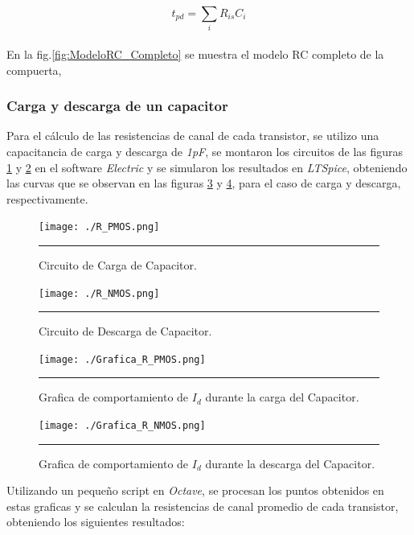 \documentclass[12pt,a4paper]{article} %
\begin{document}
\begin{equation}\label{eqn:Elmore}
t_{pd} = \sum_{i} R_{is}C_{i}
\end{equation}\\


En la fig.\ref{fig:ModeloRC_Completo} se muestra el modelo RC completo de la compuerta,
\subsubsection{Carga y descarga de un capacitor}

Para el cálculo de las resistencias de canal de cada transistor, se utilizo una capacitancia de carga y descarga de \textit{1pF}, se montaron los circuitos de las figuras \ref{fig:R_PMOS} y \ref{fig:R_NMOS} en el software \textit{Electric} y se simularon los resultados en  \textit{LTSpice}, obteniendo las curvas que se observan en las figuras \ref{fig:Grafica_R_PMOS} y \ref{fig:Grafica_R_NMOS}, para el caso de carga y descarga, respectivamente.\\

\begin{figure}[htbp]
  \centering
    \texttt{[image: ./R\_PMOS.png]}
    \rule{35em}{0.3pt}
  \caption[C_Carga]{Circuito de Carga de Capacitor.}
  \label{fig:R_PMOS}
\end{figure}

\begin{figure}[htbp]
  \centering
  	\texttt{[image: ./R\_NMOS.png]}
    \rule{35em}{0.3pt}
  \caption[C_Descarga]{Circuito de Descarga de Capacitor.}
  \label{fig:R_NMOS}
\end{figure}

\begin{figure}[htbp]
  \centering
    \texttt{[image: ./Grafica\_R\_PMOS.png]}
   \rule{35em}{0.3pt}
  \caption[G_Carga]{Grafica de comportamiento de $\textit{I}_{\textit{d}}$ durante la carga del Capacitor.}
  \label{fig:Grafica_R_PMOS}
\end{figure}

\begin{figure}[htbp]
 \centering
    \texttt{[image: ./Grafica\_R\_NMOS.png]}
    \rule{35em}{0.3pt}
  \caption[G_Descarga]{Grafica de comportamiento de $\textit{I}_{\textit{d}}$ durante la descarga del Capacitor.}
  \label{fig:Grafica_R_NMOS}
\end{figure}

Utilizando un pequeño script en \textit{Octave}, se procesan los puntos obtenidos en estas graficas y se calculan la resistencias de canal promedio de cada transistor, obteniendo los siguientes resultados:
\end{document}
